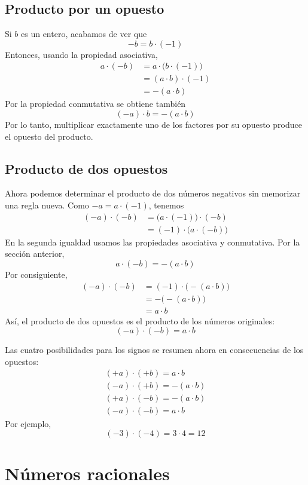 \subsection{Producto por un opuesto}

Si \(b\) es un entero, acabamos de ver que
\[
-b=b\cdot(-1)
\]
Entonces, usando la propiedad asociativa,
\begin{align*}
a\cdot(-b)
&=a\cdot\bigl(b\cdot(-1)\bigr)\\
&=(a\cdot b)\cdot(-1)\\
&=-(a\cdot b)
\end{align*}
Por la propiedad conmutativa se obtiene también
\[
(-a)\cdot b=-(a\cdot b)
\]
Por lo tanto, multiplicar exactamente uno de los factores por su opuesto produce el opuesto del producto.

\subsection{Producto de dos opuestos}

Ahora podemos determinar el producto de dos números negativos sin memorizar una regla nueva. Como \(-a=a\cdot(-1)\), tenemos
\begin{align*}
(-a)\cdot(-b)
&=\bigl(a\cdot(-1)\bigr)\cdot(-b)\\
&=(-1)\cdot\bigl(a\cdot(-b)\bigr)
\end{align*}
En la segunda igualdad usamos las propiedades asociativa y conmutativa. Por la sección anterior,
\[
a\cdot(-b)=-(a\cdot b)
\]
Por consiguiente,
\begin{align*}
(-a)\cdot(-b)
&=(-1)\cdot\bigl(-(a\cdot b)\bigr)\\
&=-\bigl(-(a\cdot b)\bigr)\\
&=a\cdot b
\end{align*}
Así, el producto de dos opuestos es el producto de los números originales:
\[
\boxed{(-a)\cdot(-b)=a\cdot b}
\]

Las cuatro posibilidades para los signos se resumen ahora en consecuencias de los opuestos:
\begin{gather*}
(+a)\cdot(+b)=a\cdot b\\
(-a)\cdot(+b)=-(a\cdot b)\\
(+a)\cdot(-b)=-(a\cdot b)\\
(-a)\cdot(-b)=a\cdot b
\end{gather*}
Por ejemplo,
\[
(-3)\cdot(-4)=3\cdot4=12
\]

\section{Números racionales}

